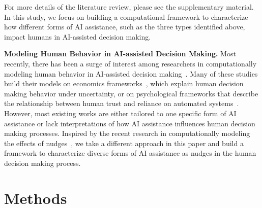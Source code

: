 \documentclass[letterpaper]{article} %
\begin{document}
For more details of the literature review, please see the supplementary material. In this study, we focus on 
building a computational framework to characterize how different forms of AI assistance, such as the three types identified above, impact humans in AI-assisted decision making. 


\vspace{2pt}
\noindent\textbf{Modeling Human Behavior in AI-assisted Decision Making.} Most recently, there has been a surge of interest among researchers in computationally modeling human behavior in AI-assisted decision making~\cite{Bansal2021IsTM,kumar2021explaining,tejeda2022ai, Pynadath2019AMM, Li_Lu_Yin_2023,lu2023strategic}.
Many of these studies build their models on economics frameworks~\cite{wang2022will}, which explain human decision making behavior under uncertainty, or on psychological frameworks that describe the relationship between human trust and reliance on automated systems~\cite{ajenaghughrure2019predictive,Li_Lu_Yin_2023}.
However, most existing works are either tailored to one specific form of AI assistance or lack interpretations of how AI assistance influences human decision making processes.
Inspired by the recent research in computationally modeling the effects of nudges~\cite{callaway2022optimal}, we take a different approach in this paper and build a framework to characterize diverse forms of AI assistance as nudges in the human decision making process.



\section{Methods}
\end{document}
